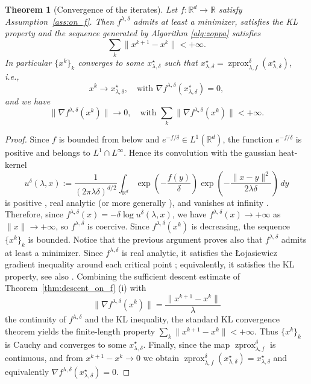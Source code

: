 \documentclass{article}
\newtheorem{theorem}{Theorem}
\newcommand{\R}{\mathbb{R}}
\newcommand{\zprox}{\ensuremath{\operatorname{zprox}}}
\begin{document}
\begin{theorem}[Convergence of the iterates]
Let $f:\R^d\to \R$ satisfy Assumption~\ref{ass:on_f}. Then $f^{\lambda,\delta}$ admits at least a minimizer, satisfies the KL property and the sequence generated by Algorithm \ref{alg:zoppa} satisfies
\[\sum_k \|x^{k+1}-x^k\| < +\infty.\]
In particular  $\{x^k\}_k$  converges to some $x_{\lambda,\delta}^\star$ such that $x_{\lambda,\delta}^\star=\zprox_{\lambda, f}^{\delta}(x_{\lambda,\delta}^\star)$, i.e.,
\[x^k \to x_{\lambda,\delta}^\star, \quad \text{with } \nabla f^{\lambda,\delta}(x_{\lambda,\delta}^\star)=0,\]
and we have
\[\|\nabla f^{\lambda,\delta}(x^k)\|\to 0, \quad \text{with } \sum_k \|\nabla f^{\lambda,\delta}(x^k)\|< +\infty.\]
\end{theorem}
\begin{proof}
Since $f$ is bounded from below and $e^{-f/\delta}\in L^1(\mathbb R^d)$, the function $e^{-f/\delta}$ is positive and belongs to $L^1\cap L^\infty$. Hence its convolution with the gaussian heat-kernel
\[
u^\delta(\lambda,x):=\frac{1}{(2\pi \lambda \delta)^{d/2}}\int_{\mathbb R^d}
\exp\!\left(-\frac{f(y)}{\delta}\right)
\exp\!\left(-\frac{\|x-y\|^2}{2\lambda\delta}\right)\,dy
\]
is positive \cite[Section 2.3.1]{evans}, real analytic \cite[Section 2.3.3]{evans} (or more generally \cite[Theorem IX.13]{ReedSimon1975}), and vanishes at infinity \cite[Proposition 8.8]{folland1999real}. Therefore, since $f^{\lambda,\delta}(x)=
-\delta\log u^\delta(\lambda,x)$, we have
\(f^{\lambda,\delta}(x)\to+\infty\) as \(\|x\|\to+\infty\), so
\(f^{\lambda,\delta}\) is coercive. Since \(f^{\lambda,\delta}(x^k)\) is
decreasing, the sequence \(\{x^k\}_k\) is bounded. Notice that the previous argument proves also that $f^{\lambda,\delta}$ admits at least a minimizer. Since \(f^{\lambda,\delta}\) is real analytic, it satisfies the
{\L}ojasiewicz gradient inequality around each critical point
\cite{Lojasiewicz1963}; equivalently, it satisfies the KL
property, see also \cite{BolteDaniilidisLewis2007}. Combining the sufficient descent estimate of Theorem~\ref{thm:descent_on_f} (i) with
\[
\|\nabla f^{\lambda,\delta}(x^k)\|
=
\frac{\|x^{k+1}-x^k\|}{\lambda}
\]
the continuity of $f^{\lambda, \delta}$ and the KL inequality, the standard KL convergence theorem \cite[Theorem 2.9]{attouch2013convergence} yields the finite-length property $\sum_k \|x^{k+1}-x^k\| < +\infty$. Thus \(\{x^k\}_k\) is Cauchy and converges to some
\(x_{\lambda,\delta}^\star\). Finally, since the map $\zprox_{\lambda, f}^\delta$ is continuous, and from
\(x^{k+1}-x^k\to 0\) we obtain
$\zprox_{\lambda, f}^\delta(x_{\lambda,\delta}^\star)=x_{\lambda,\delta}^\star$ and equivalently $
\nabla f^{\lambda,\delta}(x_{\lambda,\delta}^\star)=0$.
\end{proof}
\end{document}

